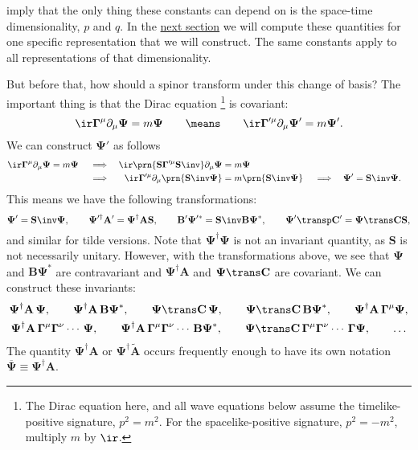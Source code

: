 \documentclass[11pt]{article}
\newcommand{\Gammab}{\boldsymbol{\Gamma}}
\renewcommand{\S}{\mathbf{S}}
\newcommand{\A}{\mathbf{A}}
\newcommand{\B}{\mathbf{B}}
\renewcommand{\C}{\mathbf{C}}
\newcommand{\At}{\widetilde{\A}}
\newcommand{\Psib}{\boldsymbol{\Psi}}
\begin{document}
 imply that the only thing these constants can depend on is the space-time dimensionality, $p$ and $q$.
In the \hyperref[sec:explicit]{next section} we will compute these quantities for one specific representation that we will construct.
The same constants apply to all representations of that dimensionality.

But before that, how should a spinor transform under this change of basis?
The important thing is that the Dirac equation%
\footnote{The Dirac equation here, and all wave equations below assume the timelike-positive signature, \(p^2 = m^2\).
For the spacelike-positive signature, \(p^2 = - m^2\), multiply \(m\) by \(\ir\).} 
is covariant:
%
\begin{equation*}
  \ir \Gammab^\mu \partial_\mu \Psib = m \Psib
  \qquad \means \qquad
  \ir \Gammab'^\mu \partial_\mu \Psib' = m \Psib'.
\end{equation*}
%
We can construct $\Psib'$ as follows
%
\begin{equation*}
\begin{aligned}
  \ir \Gammab^\mu \partial_\mu \Psib &= m \Psib &
  &\implies &
  \ir \prn{\S \Gammab'^\mu \S\inv} \partial_\mu \Psib &= m \Psib \\ &&
  &\implies &
  \ir \Gammab'^\mu \partial_\mu \prn{\S\inv\Psib} &= m \prn{\S\inv\Psib} &
  &\implies &
  \Psib' &= \S\inv \Psib.
\end{aligned}
\end{equation*}
%
This means we have the following transformations:
%
\begin{equation}\label{eq:spinorbasis}
  \Psib' = \S\inv \Psib, \qquad
  \Psib'^\dag \A' = \Psib^\dag \A \S, \qquad
  \B' \Psib'^\ast = \S\inv \B \Psib^\ast, \qquad
  \Psib'\transp \C' = \Psib\trans \C \S,
\end{equation}
%
and similar for tilde versions.
Note that $\Psib^\dag \Psib$ is not an invariant quantity, as \(\S\) is not necessarily unitary.
However, with the transformations above, we see that $\Psib$ and $\B \Psib^\ast$ are contravariant and $\Psib^\dag\A$ and $\Psib\trans \C$ are covariant.
We can construct these invariants:
%
\begin{equation}\label{eq:spinorinvt}
\begin{gathered}
  \Psib^\dag \A\, \Psib, \qquad
  \Psib^\dag \A\, \B \Psib^\ast, \qquad
  \Psib\trans \C\, \Psib, \qquad
  \Psib\trans \C\, \B \Psib^\ast, \qquad
  \Psib^\dag \A\, \Gammab^\mu \Psib, \\
  \Psib^\dag \A\, \Gammab^\mu \Gammab^\nu \cdots\, \Psib, \qquad
  \Psib^\dag \A\, \Gammab^\mu \Gammab^\nu \cdots\, \B \Psib^\ast, \qquad
  \Psib\trans \C\, \Gammab^\mu \Gammab^\nu \cdots\, \Gammab \Psib, \qquad
  \ldots
\end{gathered}
\end{equation}
%
The quantity \( \Psib^\dag \A \) or \( \Psib^\dag \At \) occurs frequently enough to have its own notation \( \overline{\Psib} \equiv \Psib^\dag \A \).
\end{document}
